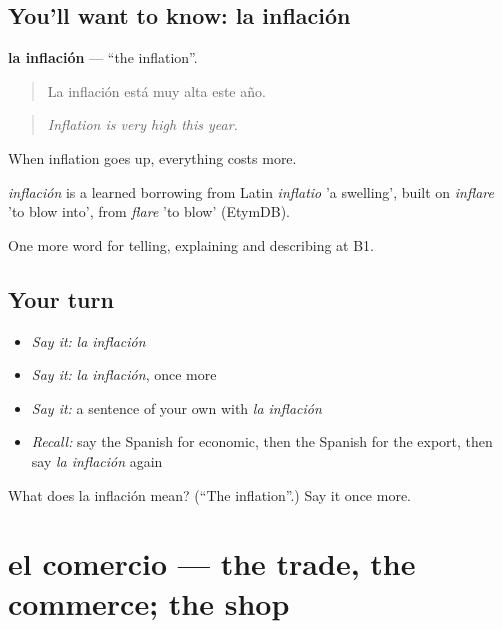 \subsection*{You'll want to know: la inflación}
\textbf{la inflación} — \textquotedblleft{}the inflation\textquotedblright{}.

\begin{quote}
La inflación está muy alta este año.
\end{quote}

\begin{quote}
\emph{Inflation is very high this year.}
\end{quote}

When inflation goes up, everything costs more.

\begin{cousinweb}
\emph{inflación} is a learned borrowing from Latin \emph{inflatio} 'a swelling', built on \emph{inflare} 'to blow into', from \emph{flare} 'to blow' (EtymDB).
\end{cousinweb}

\begin{grammarlens}[title={What you've built}]
One more word for telling, explaining and describing at B1.
\end{grammarlens}

\subsection*{Your turn}
\begin{itemize}
\raggedright
  \item \emph{Say it:} \emph{la inflación}
  \item \emph{Say it:} \emph{la inflación}, once more
  \item \emph{Say it:} a sentence of your own with \emph{la inflación}
  \item \emph{Recall:} say the Spanish for economic, then the Spanish for the export, then say \emph{la inflación} again
\end{itemize}

\begin{tcolorbox}[breakable,colback=teal!4,colframe=teal!35!black,title={Before you move on}]
What does la inflación mean? (\textquotedblleft{}The inflation\textquotedblright{}.) Say it once more.
\end{tcolorbox}
\section[el comercio]{el comercio — the trade, the commerce; the shop}

